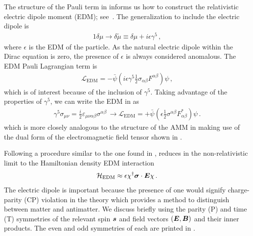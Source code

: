 The structure of the Pauli term in  informs us how to construct the relativistic electric dipole moment (EDM); see~\cite{Knecht:2003kc,Jegerlehner:2017gek}. The generalization to include the electric dipole is
\begin{alignat}{1}
	\label{edm:1} \delta\mu\rightarrow\delta\tilde{\mu}\equiv\delta\mu+i\epsilon\gamma^{5}\,,
\end{alignat}
where $\epsilon$ is the EDM of the particle. As the natural electric dipole within the Dirac equation is zero, the presence of $\epsilon$ is always considered anomalous. The EDM Pauli Lagrangian term is
\begin{gather}
    \label{ledm:1}
    \mathcal{L}_\mathrm{EDM} = -{\bar\psi}\left(i\epsilon\gamma^{5}\frac{1}{2}\sigma_{\alpha\beta}F^{\alpha\beta}\right)\psi\,,
\end{gather}
which is of interest because of the inclusion of $\gamma^{5}$. Taking advantage of the properties of $\gamma^{5}$, we can write the EDM in  as
\begin{gather}
    \label{ledm:3}
    \gamma^{5}\sigma_{\mu\nu}=\frac{i}{2}\varepsilon_{\mu\nu\alpha\beta}\sigma^{\alpha\beta}\,\rightarrow
    \mathcal{L}_\mathrm{EDM} = +{\bar\psi}\left(\epsilon\frac{1}{2}\sigma^{\alpha\beta}F_{\alpha\beta}^{*}\right)\psi\,.
\end{gather}
which is more closely analogous to the structure of the AMM in  making use of the dual form of the electromagnetic field tensor shown in .

Following a procedure similar to the one found in ,  reduces in the non-relativistic limit to the Hamiltonian density EDM interaction
\begin{gather}
    \label{ledm:4}
    \mathcal{H}_\mathrm{EDM} \approx \epsilon\chi^{\dag}\boldsymbol{\sigma}\cdot\boldsymbol{E}\chi\,.
\end{gather}
The electric dipole is important because the presence of one would signify charge-parity (CP) violation in the theory which provides a method to distinguish between matter and antimatter. We discuss briefly using the parity (P) and time (T) symmetries of the relevant spin $\boldsymbol{s}$ and field vectors $(\boldsymbol{E},\boldsymbol{B})$ and their inner products. The even and odd symmetries of each are printed in .

